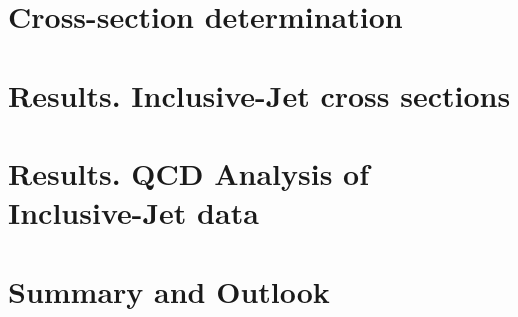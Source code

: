 \documentclass[12pt,a4paper,reqno,twoside,final]{scrbook}%
\numberwithin{equation}{subsection}
\begin{document}
 \chapter{Cross-section determination}
 \label{ch:unfolding}
 

\chapter{Results. Inclusive-Jet cross sections}
\label{ch:resultscs}
% 

\chapter{Results. QCD Analysis of Inclusive-Jet data}
\label{ch:resultsqcdfit}


\newpage
\chapter*{Summary and Outlook}
\label{ch:summary}


\end{document}
